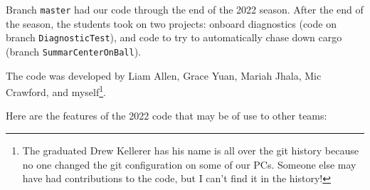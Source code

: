 \documentclass[]{article}
\newcommand{\zztt}[1]{{\texttt{\footnotesize{#1}}}}
\begin{document}
Branch \zztt{master} had our code through the end of the 2022 season. After the end of the season, the students took on two projects: onboard diagnostics (code on branch \zztt{DiagnosticTest}), and code to try to automatically chase down cargo (branch \zztt{SummarCenterOnBall}).

\iffalse
In the past, I have listed out the student's names and graduation dates to acknowledge their efforts; because of privacy considerations, I cannot do this in this document.
\else
The code was developed by Liam Allen, Grace Yuan, Mariah Jhala, Mic Crawford, and myself\footnote{The graduated Drew Kellerer has his name is all over the git history because no one changed the git configuration on some of our PCs. Someone else may have had contributions to the code, but I can't find it in the history!}.
\fi

\pagebreak

Here are the features of the 2022 code that may be of use to other teams:
\end{document}
